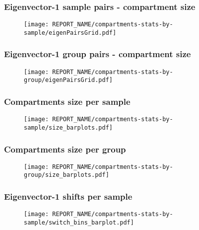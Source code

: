 \begin{frame} 												%
\frametitle{Eigenvector-1 sample pairs - compartment size}						%
\begin{figure}												%
\texttt{[image: REPORT\_NAME/compartments-stats-by-sample/eigenPairsGrid.pdf]}	%
\end{figure}												%
\end{frame}												%

\begin{frame}												%
\frametitle{Eigenvector-1 group pairs - compartment size}						%
\begin{figure}												%
\texttt{[image: REPORT\_NAME/compartments-stats-by-group/eigenPairsGrid.pdf]}	%
\end{figure}												%
\end{frame}												%

\begin{frame}												%
\frametitle{Compartments size per sample}								%
\begin{figure}												%
\texttt{[image: REPORT\_NAME/compartments-stats-by-sample/size\_barplots.pdf]}	%
\end{figure}												%
\end{frame}												%

\begin{frame}												%
\frametitle{Compartments size per group}								%
\begin{figure}												%
\texttt{[image: REPORT\_NAME/compartments-stats-by-group/size\_barplots.pdf]}	%
\end{figure}												%
\end{frame}												%

\begin{frame}												%
\frametitle{Eigenvector-1 shifts per sample}								%
\begin{figure}												%
\texttt{[image: REPORT\_NAME/compartments-stats-by-sample/switch\_bins\_barplot.pdf]}	%
\end{figure}												%
\end{frame}												%

